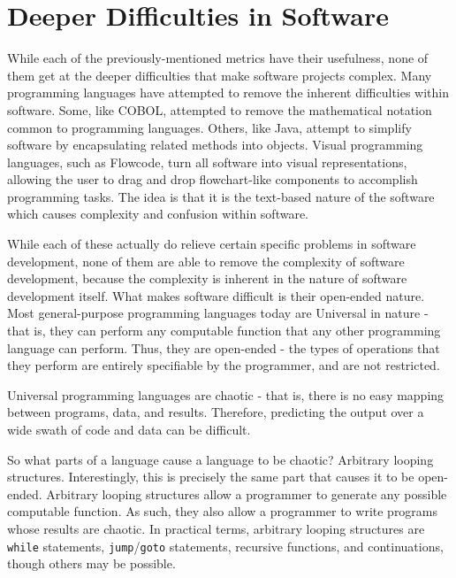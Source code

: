 \section{Deeper Difficulties in Software}

While each of the previously-mentioned metrics have their usefulness, none of them get at the deeper difficulties that make software projects complex.  Many programming languages have attempted to remove the inherent difficulties within software.  Some, like COBOL, attempted to remove the mathematical notation common to programming languages.  Others, like Java, attempt to simplify software by encapsulating related methods into objects.  Visual programming languages, such as Flowcode, turn all software into visual representations, allowing the user to drag and drop flowchart-like components to accomplish programming tasks.  The idea is that it is the text-based nature of the software which causes complexity and confusion within software.

While each of these actually do relieve certain specific problems in software development, none of them are able to remove the complexity of software development, because the complexity is inherent in the nature of software development itself.  What makes software difficult is their open-ended nature.  Most general-purpose programming languages today are Universal in nature - that is, they can perform any computable function that any other programming language can perform.  Thus, they are open-ended - the types of operations that they perform are entirely specifiable by the programmer, and are not restricted.

Universal programming languages are chaotic - that is, there is no easy mapping between programs, data, and results.  Therefore, predicting the output over a wide swath of code and data can be difficult.  

So what parts of a language cause a language to be chaotic?  Arbitrary looping structures.  Interestingly, this is precisely the same part that causes it to be open-ended.  Arbitrary looping structures allow a programmer to generate any possible computable function.  As such, they also allow a programmer to write programs whose results are chaotic.  In practical terms, arbitrary looping structures are \verb+while+ statements, \verb+jump+/\verb+goto+ statements, recursive functions, and continuations, though others may be possible.

